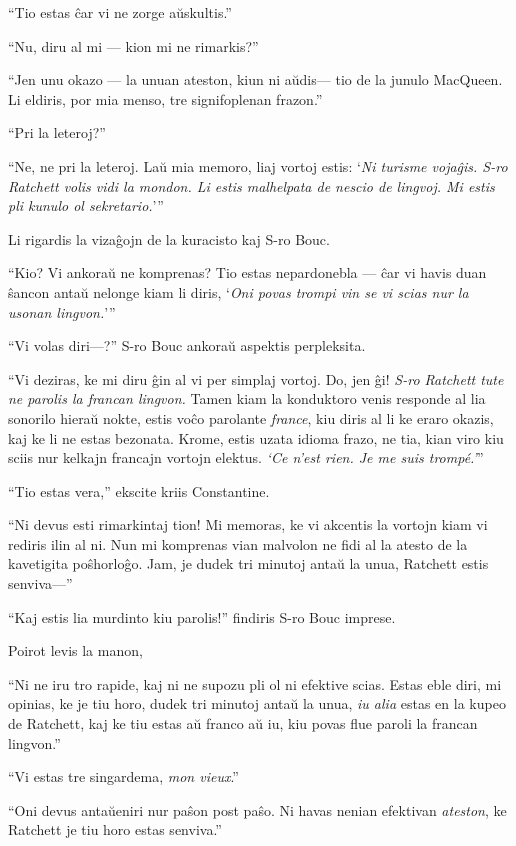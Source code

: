 ``Tio estas ĉar vi ne zorge aŭskultis.''

``Nu, diru al mi --- kion mi ne rimarkis?''

``Jen unu okazo --- la unuan ateston, kiun ni aŭdis--- tio de la junulo MacQueen. Li eldiris, por mia menso, tre signifoplenan frazon.''

``Pri la leteroj?''

``Ne, ne pri la leteroj. Laŭ mia memoro, liaj vortoj estis: `\emph{Ni turisme vojaĝis. S-ro Ratchett volis vidi la mondon. Li estis malhelpata de nescio de lingvoj. Mi estis pli kunulo ol sekretario.}'''

Li rigardis la vizaĝojn de la kuracisto kaj S-ro Bouc.

``Kio? Vi ankoraŭ ne komprenas? Tio estas nepardonebla --- ĉar vi havis duan ŝancon antaŭ nelonge kiam li diris, `\emph{Oni povas trompi vin se vi scias nur la usonan lingvon.}'''

``Vi volas diri---?'' S-ro Bouc ankoraŭ aspektis perpleksita.

``Vi deziras, ke mi diru ĝin al vi per simplaj vortoj. Do, jen ĝi! \emph{S-ro Ratchett tute ne parolis la francan lingvon.} Tamen kiam la konduktoro venis responde al lia sonorilo hieraŭ nokte, estis voĉo parolante \emph{france}, kiu diris al li ke eraro okazis, kaj ke li ne estas bezonata. Krome, estis uzata idioma frazo, ne tia, kian viro kiu sciis nur kelkajn francajn vortojn elektus. \emph{`Ce n'est rien. Je me suis trompé.'}''

``Tio estas vera,'' ekscite kriis Constantine.

``Ni devus esti rimarkintaj tion! Mi memoras, ke vi akcentis la vortojn kiam vi rediris ilin al ni. Nun mi komprenas vian malvolon ne fidi al la atesto de la kavetigita poŝhorloĝo. Jam, je dudek tri minutoj antaŭ la unua, Ratchett estis senviva---''

``Kaj estis lia murdinto kiu parolis!'' findiris S-ro Bouc imprese.

Poirot levis la manon,

``Ni ne iru tro rapide, kaj ni ne supozu pli ol ni efektive scias. Estas eble diri, mi opinias, ke je tiu horo, dudek tri minutoj antaŭ la unua, \emph{iu alia} estas en la kupeo de Ratchett, kaj ke tiu estas aŭ franco aŭ iu, kiu povas flue paroli la francan lingvon.''

``Vi estas tre singardema, \emph{mon vieux}.''

``Oni devus antaŭeniri nur paŝon post paŝo. Ni havas nenian efektivan \emph{ateston}, ke Ratchett je tiu horo estas senviva.''

